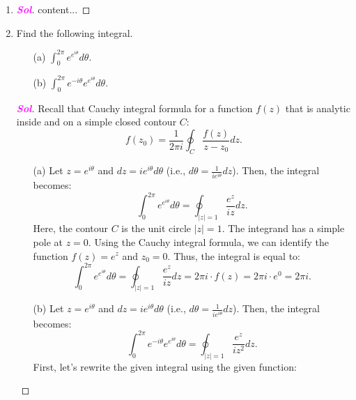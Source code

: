\documentclass{article}
\newcommand{\ie}{\textnormal{i.e.}}
\theoremstyle{definition}
\newcommand{\of}[1]{\left( #1 \right)}
\newcommand{\abs}[1]{\left\lvert #1 \right\rvert}
\newcommand{\sol}{\textcolor{magenta}{\bf Sol}}
\begin{document}
\begin{enumerate}
\begin{itemize}
	\end{itemize}
	\begin{proof}[\sol]
		\begin{itemize}
			\item[(a)] Let $f\of{z}=e^z$ then \[
			\int_C\frac{e^z}{z}dz=\int_C\frac{f\of{z}}{z-0}dz=f\of{0}2\pi i=2\pi i.
			\]
			\item[(b)] Let $f\of{z}=z^2$ then \[
			\int_C\frac{z^2}{z-1}dz=\int_C\frac{f\of{z}}{z-1}dz=f\of{1}2\pi i=2\pi i.
			\]
			\item[(c)] $\displaystyle\int_C\frac{z}{z-3}dz$
			\item[(d)] $\displaystyle\int_C\frac{\cos z}{z\of{z^2+9}}dz$
		\end{itemize}
	\end{proof}
	\item 
	\begin{proof}[\sol]
		content...
	\end{proof}
	\item Find the following integral. \begin{itemize}
		\item[(a)] $\displaystyle\int_0^{2\pi}e^{e^{i\theta}}d\theta$.
		\item[(b)] $\displaystyle\int_0^{2\pi}e^{-i\theta}e^{e^{i\theta}}d\theta$.
	\end{itemize}
	\begin{proof}[\sol]
		Recall that Cauchy integral formula for a function $f\of{z}$ that is analytic inside and on a simple closed contour $C$: \[
		f\of{z_0}=\frac{1}{2\pi i}\oint_C\frac{f\of{z}}{z-z_0}dz.
		\]
		\vspace{4pt}
		\begin{itemize}
			\item[(a)] Let $z = e^{i\theta}$ and $dz = ie^{i\theta} d\theta$ (\ie, $d\theta=\frac{1}{ie^{i\theta}}dz$). Then, the integral becomes: \[
			\int_0^{2\pi}e^{e^{i\theta}}d\theta=\oint_{\abs{z}=1}\frac{e^z}{iz}dz.
			\] Here, the contour $C$ is the unit circle $|z|=1$. The integrand has a simple pole at $z=0$. Using the Cauchy integral formula, we can identify the function $f(z) = e^z$ and $z_0=0$. Thus, the integral is equal to:
			\[
			\int_0^{2\pi}e^{e^{i\theta}}d\theta = \oint_{\abs{z}=1}\frac{e^z}{iz}dz = 2\pi i\cdot f\of{z}=2\pi i\cdot e^0 = 2\pi i.
			\]
			\vspace{4pt}
			\item[(b)] Let $z = e^{i\theta}$ and $dz = ie^{i\theta} d\theta$ (\ie, $d\theta=\frac{1}{ie^{i\theta}}dz$). Then, the integral becomes: \[
			\int_0^{2\pi}e^{-i\theta}e^{e^{i\theta}}d\theta=\oint_{\abs{z}=1}\frac{e^z}{iz^2}dz.
			\] 
			First, let's rewrite the given integral using the given function:
			

\end{itemize}
\end{proof}
\end{enumerate}
\end{document}
